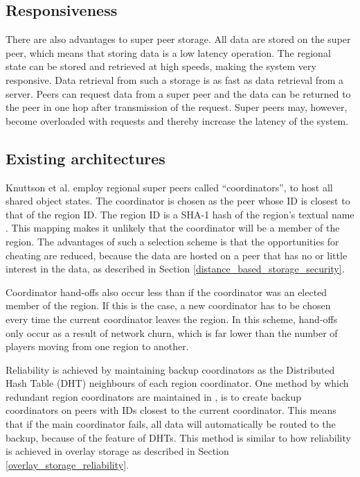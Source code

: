 \subsection{Responsiveness}
There are also advantages to super peer storage. All data are stored on the super peer, which means that storing data is a low latency operation. The regional state can be stored and retrieved at high speeds, making the system very responsive. Data retrieval from such a storage is as fast as data retrieval from a server. Peers can request data from a super peer and the data can be returned to the peer in one hop after transmission of the request. Super peers may, however, become overloaded with requests and thereby increase the latency of the system.

\subsection{Existing architectures}

Knuttson et al. \cite{knutsson_p2p_first} employ regional super peers called ``coordinators'', to host all shared object states. The coordinator is chosen as the peer whose ID is closest to that of the region ID. The region ID is a SHA-1 hash of the region's textual name \cite{SHA}. This mapping makes it unlikely that the coordinator will be a member of the region. The advantages of such a selection scheme is that the opportunities for cheating are reduced, because the data are hosted on a peer that has no or little interest in the data, as described in Section
\ref{distance_based_storage_security}.

Coordinator hand-offs also occur less than if the coordinator was an elected member of the region. If this is the case, a new coordinator has to be chosen every time the current coordinator leaves the region. In this scheme, hand-offs only occur as a result of network churn, which is far lower than the number of players moving from one region to another.

Reliability is achieved by maintaining backup coordinators as the Distributed Hash Table (DHT) neighbours of each region coordinator. One method by which redundant region coordinators are maintained in \cite{knutsson_p2p_first}, is to create backup coordinators on peers with IDs closest to the current coordinator. This means that if the main coordinator fails, all data will automatically be routed to the backup, because of the feature of DHTs. This method is similar to how reliability is achieved in overlay storage as described in Section \ref{overlay_storage_reliability}.

